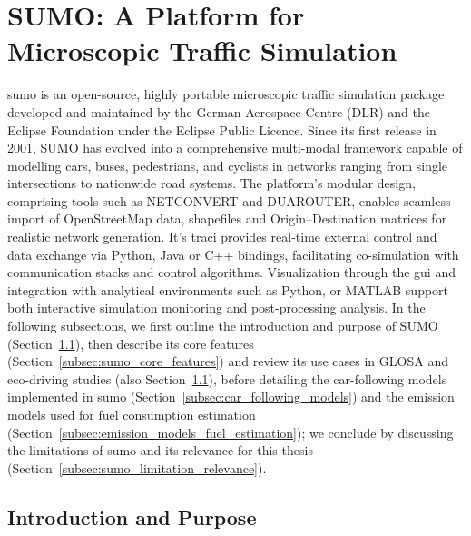 \section{SUMO: A Platform for Microscopic Traffic Simulation}
\label{sec:SUMO}

\ac{sumo} is an open-source, highly portable microscopic traffic simulation package developed and maintained by the German Aerospace Centre (DLR) and the Eclipse Foundation under the Eclipse Public Licence. \cite{SUMOWebsite2025}\cite{EclipseNews2017} Since its first release in 2001, SUMO has evolved into a comprehensive multi-modal framework capable of modelling cars, buses, pedestrians, and cyclists in networks ranging from single intersections to nationwide road systems. \cite{SUMODocs2025}\cite{Krajzewicz2002} The platform’s modular design, comprising tools such as NETCONVERT and DUAROUTER, enables seamless import of OpenStreetMap data, shapefiles and Origin–Destination matrices for realistic network generation. \cite{SUMODocs2025} It's \ac{traci} provides real-time external control and data exchange via Python, Java or C++ bindings, facilitating co-simulation with communication stacks and control algorithms. Visualization through the \ac{gui} and integration with analytical environments such as Python, or MATLAB support both interactive simulation monitoring and post-processing analysis. \cite{TraCIDocs2024} 
\mynewline
In the following subsections, we first outline the introduction and purpose of SUMO (Section~\ref{subsec:sumo_intro_purpose}), then describe its core features (Section~\ref{subsec:sumo_core_features}) and review its use cases in GLOSA and eco-driving studies (also Section~\ref{subsec:sumo_intro_purpose}), before detailing the car-following models implemented in \ac{sumo} (Section~\ref{subsec:car_following_models}) and the emission models used for fuel consumption estimation (Section~\ref{subsec:emission_models_fuel_estimation}); we conclude by discussing the limitations of \ac{sumo} and its relevance for this thesis (Section~\ref{subsec:sumo_limitation_relevance}).


\subsection{Introduction and Purpose}
\label{subsec:sumo_intro_purpose}

